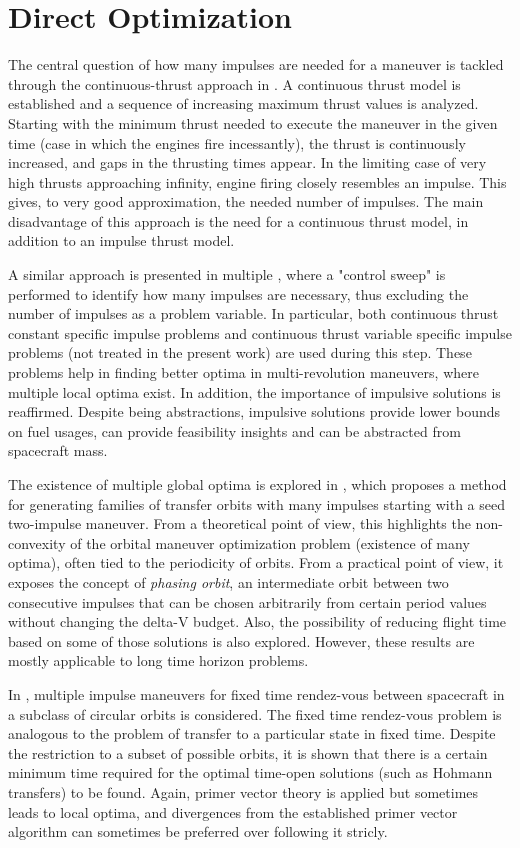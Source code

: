 \section{Direct Optimization}

The central question of how many impulses are needed for a maneuver is tackled through the continuous-thrust approach in \cite{how_many_impulses}. A continuous thrust model is established and a sequence of increasing maximum thrust values is analyzed. Starting with the minimum thrust needed to execute the maneuver in the given time (case in which the engines fire incessantly), the thrust is continuously increased, and gaps in the thrusting times appear. In the limiting case of very high thrusts approaching infinity, engine firing closely resembles an impulse. This gives, to very good approximation, the needed number of impulses. The main disadvantage of this approach is the need for a continuous thrust model, in addition to an impulse thrust model. 

A similar approach is presented in multiple \cite{mult_rev_many_imp}, where a "control sweep" is performed to identify how many impulses are necessary, thus excluding the number of impulses as a problem variable. In particular, both continuous thrust constant specific impulse problems and continuous thrust variable specific impulse problems (not treated in the present work) are used during this step. These problems help in finding better optima in multi-revolution maneuvers, where multiple local optima exist. In addition, the importance of impulsive solutions is reaffirmed. Despite being abstractions, impulsive solutions provide lower bounds on fuel usages, can provide feasibility insights and can be abstracted from spacecraft mass.

The existence of multiple global optima is explored in \cite{inf_many_optima}, which proposes a method for generating families of transfer orbits with many impulses starting with a seed two-impulse maneuver. From a theoretical point of view, this highlights the non-convexity of the orbital maneuver optimization problem (existence of many optima), often tied to the periodicity of orbits. From a practical point of view, it exposes the concept of \textit{phasing orbit}, an intermediate orbit between two consecutive impulses that can be chosen arbitrarily from certain period values without changing the delta-V budget. Also, the possibility of reducing flight time based on some of those solutions is also explored. However, these results are mostly applicable to long time horizon problems.

In \cite{multi_impulse_circ_rendezvous}, multiple impulse maneuvers for fixed time rendez-vous between spacecraft in a subclass of circular orbits is considered. The fixed time rendez-vous problem is analogous to the problem of transfer to a particular state in fixed time. Despite the restriction to a subset of possible orbits, it is shown that there is a certain minimum time required for the optimal time-open solutions (such as Hohmann transfers) to be found. Again, primer vector theory is applied but sometimes leads to local optima, and divergences from the established primer vector algorithm can sometimes be preferred over following it stricly.



